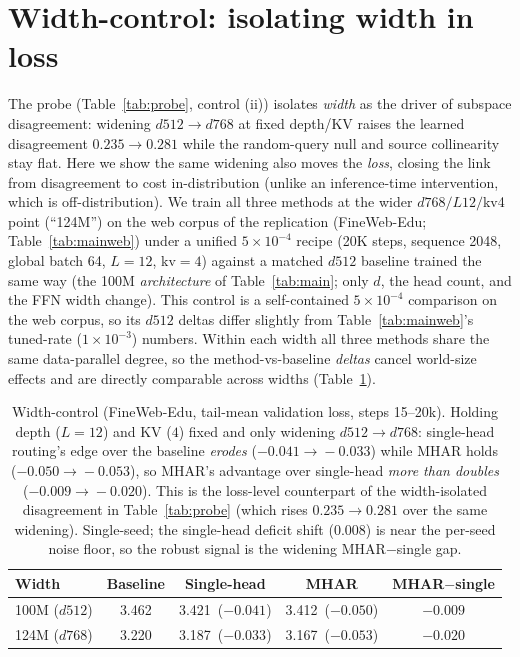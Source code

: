 \documentclass{article}
\begin{document}
\section{Width-control: isolating width in loss}
\label{app:widthcost}
The probe (Table~\ref{tab:probe}, control (ii)) isolates \emph{width} as the driver of
subspace disagreement: widening $d512\!\to\!d768$ at fixed depth/KV raises the learned
disagreement $0.235\!\to\!0.281$ while the random-query null and source collinearity stay
flat. Here we show the same widening also moves the \emph{loss}, closing the link from
disagreement to cost in-distribution (unlike an inference-time intervention, which is
off-distribution). We train all three methods at the wider $d768/L12/$kv4 point
(``124M'') on the web corpus of the replication (FineWeb-Edu;
Table~\ref{tab:mainweb}) under a unified $5\times10^{-4}$ recipe (20K steps,
sequence 2048, global
batch 64, $L{=}12$, kv${=}4$) against a matched $d512$ baseline trained the same way
(the 100M \emph{architecture} of Table~\ref{tab:main}; only $d$, the head count, and
the FFN width change). This control is a self-contained $5\times10^{-4}$ comparison
on the web corpus,
so its $d512$ deltas differ slightly from Table~\ref{tab:mainweb}'s tuned-rate
($1\times10^{-3}$) numbers. Within each width
all three methods share the same data-parallel degree, so the method-vs-baseline
\emph{deltas} cancel world-size effects and are directly comparable across widths
(Table~\ref{tab:widthcost}).

\begin{table}[h]
\centering
\caption{Width-control (FineWeb-Edu, tail-mean validation loss, steps 15--20k). Holding depth
($L{=}12$) and KV ($4$) fixed and only widening $d512\!\to\!d768$: single-head routing's
edge over the baseline \emph{erodes} ($-0.041\!\to\!-0.033$) while MHAR holds
($-0.050\!\to\!-0.053$), so MHAR's advantage over single-head \emph{more than doubles}
($-0.009\!\to\!-0.020$). This is the loss-level counterpart of the width-isolated
disagreement in Table~\ref{tab:probe} (which rises $0.235\!\to\!0.281$ over the same
widening). Single-seed; the single-head deficit shift ($0.008$) is near the per-seed
noise floor, so the robust signal is the widening MHAR$-$single gap.}
\label{tab:widthcost}
\begin{tabular}{lcccc}
\toprule
\textbf{Width} & \textbf{Baseline} & \textbf{Single-head} & \textbf{MHAR} & \textbf{MHAR$-$single} \\
\midrule
100M ($d512$) & 3.462 & 3.421 \,($-0.041$) & 3.412 \,($-0.050$) & $-0.009$ \\
124M ($d768$) & 3.220 & 3.187 \,($-0.033$) & 3.167 \,($-0.053$) & $\mathbf{-0.020}$ \\
\bottomrule
\end{tabular}
\end{table}
\end{document}
